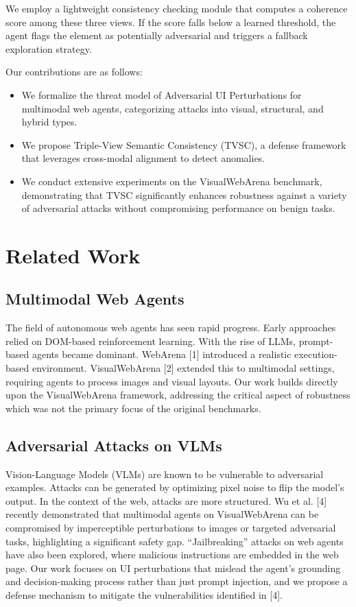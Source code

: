 \documentclass{llncs}
\begin{document}
We employ a lightweight consistency checking module that computes a coherence score among these three views. If the score falls below a learned threshold, the agent flags the element as potentially adversarial and triggers a fallback exploration strategy.

Our contributions are as follows:
\begin{itemize}
    \item We formalize the threat model of Adversarial UI Perturbations for multimodal web agents, categorizing attacks into visual, structural, and hybrid types.
    \item We propose Triple-View Semantic Consistency (TVSC), a defense framework that leverages cross-modal alignment to detect anomalies.
    \item We conduct extensive experiments on the VisualWebArena benchmark, demonstrating that TVSC significantly enhances robustness against a variety of adversarial attacks without compromising performance on benign tasks.
\end{itemize}

\section{Related Work}

\subsection{Multimodal Web Agents}
The field of autonomous web agents has seen rapid progress. Early approaches relied on DOM-based reinforcement learning. With the rise of LLMs, prompt-based agents became dominant. WebArena [1] introduced a realistic execution-based environment. VisualWebArena [2] extended this to multimodal settings, requiring agents to process images and visual layouts. Our work builds directly upon the VisualWebArena framework, addressing the critical aspect of robustness which was not the primary focus of the original benchmarks.

\subsection{Adversarial Attacks on VLMs}
Vision-Language Models (VLMs) are known to be vulnerable to adversarial examples. Attacks can be generated by optimizing pixel noise to flip the model's output. In the context of the web, attacks are more structured. Wu et al. [4] recently demonstrated that multimodal agents on VisualWebArena can be compromised by imperceptible perturbations to images or targeted adversarial tasks, highlighting a significant safety gap. ``Jailbreaking'' attacks on web agents have also been explored, where malicious instructions are embedded in the web page. Our work focuses on UI perturbations that mislead the agent's grounding and decision-making process rather than just prompt injection, and we propose a defense mechanism to mitigate the vulnerabilities identified in [4].
\end{document}
